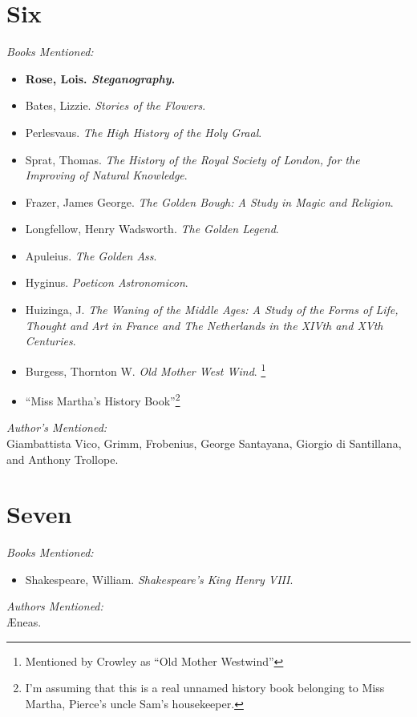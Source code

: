 \documentclass[12pt,makeidx]{extreport}
\begin{document}
\section{Six}
\textit{Books Mentioned:}
\begin{itemize}
\item \textbf{Rose, Lois. \textit{Steganography}.} \cite{Rose}
\item Bates, Lizzie. \textit{Stories of the Flowers}. \cite{Bates1872}
\item Perlesvaus. \textit{The High History of the Holy Graal}. \cite{Perlesvaus1898}
\item Sprat, Thomas. \textit{The History of the Royal Society of London, for the Improving of
Natural Knowledge}. \cite{Sprat1667}
\item Frazer, James George. \textit{The Golden Bough: A Study in Magic and Religion}. \cite{Frazer1932}
\item Longfellow, Henry Wadsworth. \textit{The Golden Legend}. \cite{Longfellow}
\item Apuleius. \textit{The Golden Ass}. \cite{Apuleius1998}
\item Hyginus. \textit{Poeticon Astronomicon}. \cite{Hyginus}
\item Huizinga, J. \textit{The Waning of the Middle Ages: A Study of the Forms of Life, Thought and Art in France and The Netherlands in the XIVth and XVth Centuries}. \cite{Huizinga2016}
\item Burgess, Thornton W. \textit{Old Mother West Wind}. \cite{Burgess2012}\footnote{Mentioned by Crowley as “Old Mother Westwind”}
\item “Miss Martha's History Book”\footnote{I'm assuming that this is a real unnamed history book belonging to Miss Martha, Pierce's uncle Sam's housekeeper.}
\end{itemize}
\textit{Author's Mentioned:}\\
Giambattista Vico, Grimm, Frobenius, George Santayana, Giorgio di Santillana, and Anthony Trollope.

\section{Seven}
\textit{Books Mentioned:}
\begin{itemize}
\item Shakespeare, William. \textit{Shakespeare's King Henry VIII}. \cite{Shakespeare1912}
\end{itemize}
\textit{Authors Mentioned:}\\
Æneas.
\end{document}
